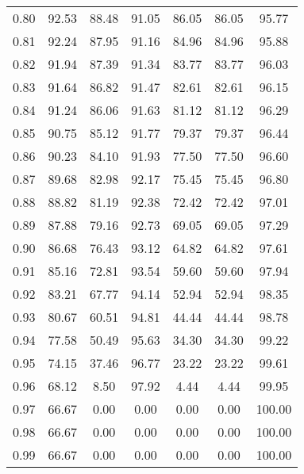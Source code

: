 \begin{tabular}{|c|c|c|c|c|c|c|}
      0.80 &     92.53 &     88.48 &      91.05 &   86.05 &      86.05 &         95.77 \\
      0.81 &     92.24 &     87.95 &      91.16 &   84.96 &      84.96 &         95.88 \\
      0.82 &     91.94 &     87.39 &      91.34 &   83.77 &      83.77 &         96.03 \\
      0.83 &     91.64 &     86.82 &      91.47 &   82.61 &      82.61 &         96.15 \\
      0.84 &     91.24 &     86.06 &      91.63 &   81.12 &      81.12 &         96.29 \\
      0.85 &     90.75 &     85.12 &      91.77 &   79.37 &      79.37 &         96.44 \\
      0.86 &     90.23 &     84.10 &      91.93 &   77.50 &      77.50 &         96.60 \\
      0.87 &     89.68 &     82.98 &      92.17 &   75.45 &      75.45 &         96.80 \\
      0.88 &     88.82 &     81.19 &      92.38 &   72.42 &      72.42 &         97.01 \\
      0.89 &     87.88 &     79.16 &      92.73 &   69.05 &      69.05 &         97.29 \\
      0.90 &     86.68 &     76.43 &      93.12 &   64.82 &      64.82 &         97.61 \\
      0.91 &     85.16 &     72.81 &      93.54 &   59.60 &      59.60 &         97.94 \\
      0.92 &     83.21 &     67.77 &      94.14 &   52.94 &      52.94 &         98.35 \\
      0.93 &     80.67 &     60.51 &      94.81 &   44.44 &      44.44 &         98.78 \\
      0.94 &     77.58 &     50.49 &      95.63 &   34.30 &      34.30 &         99.22 \\
      0.95 &     74.15 &     37.46 &      96.77 &   23.22 &      23.22 &         99.61 \\
      0.96 &     68.12 &      8.50 &      97.92 &    4.44 &       4.44 &         99.95 \\
      0.97 &     66.67 &      0.00 &       0.00 &    0.00 &       0.00 &        100.00 \\
      0.98 &     66.67 &      0.00 &       0.00 &    0.00 &       0.00 &        100.00 \\
      0.99 &     66.67 &      0.00 &       0.00 &    0.00 &       0.00 &        100.00 \\
\bottomrule
\end{tabular}
